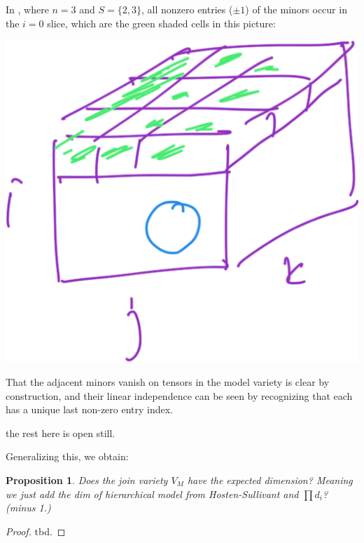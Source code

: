 \documentclass[12pt]{extarticle}
\newtheorem{proposition}[theorem]{Proposition}
\theoremstyle{definition}
\numberwithin{theorem}{section}
\begin{document}
In \cite[Example 2.4]{HoSu02}, where $n=3$ and $S=\{2,3\}$, all nonzero entries ($\pm 1$) of the minors occur in the $i=0$ slice, which are the green shaded cells in this picture: 

\includegraphics[scale=0.05]{smallBox.PNG}

That the adjacent minors vanish on tensors in the model variety is clear by construction, and their linear independence can be seen by recognizing that each has a unique last non-zero entry index. 

{\color{magenta}the rest here is open still.} 

Generalizing this, we obtain: 
\begin{proposition}
	Does the join variety $V_M$ have the expected dimension? Meaning we just add the dim of  hierarchical model from Hosten-Sullivant and $\prod d_i$? (minus 1.) 
\end{proposition}
\begin{proof}
	tbd.
\end{proof} 
\end{document}
